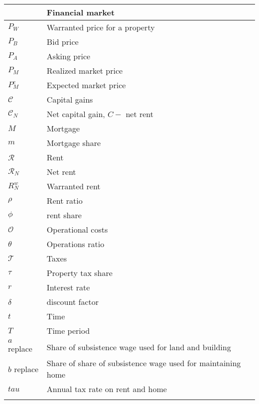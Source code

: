 \begin{longtable}{lp{10cm}}
\hline           & \textbf{Financial market}             \\ \hline
$P_W$            &  Warranted price for a property       \\
$P_B$            &  Bid price                            \\ %
$P_A$            &  Asking price                         \\
$P_M$            &  Realized market price                \\
$P_M^e$          &  Expected market price                \\
$\mathcal{C}$    &  Capital gains                     \\ %
$\mathcal{C}_N$  &  Net capital gain, $C -$ net rent  \\
$M$              &  Mortgage                          \\ 
$m$              &  Mortgage share                    \\ 
$\mathcal{R}$    &  Rent                              \\
$\mathcal{R}_N$  &  Net rent                          \\
${R}^w_N$        &  Warranted rent                    \\
$\rho$           &  Rent ratio                        \\
$\phi$           &  \Gls{rent share}                  \\
$\mathcal{O}$    &  Operational costs                 \\
$\theta$         &  Operations ratio                  \\ %
$\mathcal{T}$    &  Taxes                             \\ %
$\tau$           &  Property tax share                \\ %
$r$              &  Interest rate                     \\
$\delta$         &  \Gls{discount factor}             \\
$t$              &  Time                              \\
$T$              &  Time period                       \\

$a$ replace      &  Share of subsistence wage  used for land and building \\
$b$ replace      &  Share of share of subsistence wage used for maintaining home \\ %
$tau$            &  Annual tax rate on rent and home \\ %

\hline
\color{black}
\end{longtable}  

